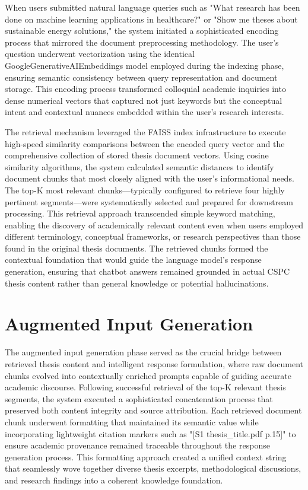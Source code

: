 \begin{refsection}
When users submitted natural language queries such as "What research has been done on machine learning applications in healthcare?" or "Show me theses about sustainable energy solutions," the system initiated a sophisticated encoding process that mirrored the document preprocessing methodology. The user's question underwent vectorization using the identical GoogleGenerativeAIEmbeddings model employed during the indexing phase, ensuring semantic consistency between query representation and document storage. This encoding process transformed colloquial academic inquiries into dense numerical vectors that captured not just keywords but the conceptual intent and contextual nuances embedded within the user's research interests.

The retrieval mechanism leveraged the FAISS index infrastructure to execute high-speed similarity comparisons between the encoded query vector and the comprehensive collection of stored thesis document vectors. Using cosine similarity algorithms, the system calculated semantic distances to identify document chunks that most closely aligned with the user's informational needs. The top-K most relevant chunks—typically configured to retrieve four highly pertinent segments—were systematically selected and prepared for downstream processing. This retrieval approach transcended simple keyword matching, enabling the discovery of academically relevant content even when users employed different terminology, conceptual frameworks, or research perspectives than those found in the original thesis documents. The retrieved chunks formed the contextual foundation that would guide the language model's response generation, ensuring that chatbot answers remained grounded in actual CSPC thesis content rather than general knowledge or potential hallucinations.


\section{Augmented Input Generation}
The augmented input generation phase served as the crucial bridge between retrieved thesis content and intelligent response formulation, where raw document chunks evolved into contextually enriched prompts capable of guiding accurate academic discourse. Following successful retrieval of the top-K relevant thesis segments, the system executed a sophisticated concatenation process that preserved both content integrity and source attribution. Each retrieved document chunk underwent formatting that maintained its semantic value while incorporating lightweight citation markers such as "[S1 thesis_title.pdf p.15]" to ensure academic provenance remained traceable throughout the response generation process. This formatting approach created a unified context string that seamlessly wove together diverse thesis excerpts, methodological discussions, and research findings into a coherent knowledge foundation.


\end{refsection}
